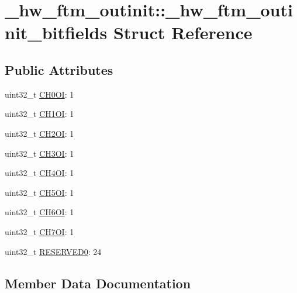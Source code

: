 \hypertarget{struct__hw__ftm__outinit_1_1__hw__ftm__outinit__bitfields}{}\section{\+\_\+hw\+\_\+ftm\+\_\+outinit\+:\+:\+\_\+hw\+\_\+ftm\+\_\+outinit\+\_\+bitfields Struct Reference}
\label{struct__hw__ftm__outinit_1_1__hw__ftm__outinit__bitfields}
\subsection*{Public Attributes}
\begin{DoxyCompactItemize}
\item 
uint32\+\_\+t \hyperlink{struct__hw__ftm__outinit_1_1__hw__ftm__outinit__bitfields_ac2361115514d6a903c91372a494c6cca}{C\+H0\+OI}\+: 1
\item 
uint32\+\_\+t \hyperlink{struct__hw__ftm__outinit_1_1__hw__ftm__outinit__bitfields_a6dea260517b53072ecbd94035b22b7a7}{C\+H1\+OI}\+: 1
\item 
uint32\+\_\+t \hyperlink{struct__hw__ftm__outinit_1_1__hw__ftm__outinit__bitfields_a97a917105c9550f2362c9abc636c1914}{C\+H2\+OI}\+: 1
\item 
uint32\+\_\+t \hyperlink{struct__hw__ftm__outinit_1_1__hw__ftm__outinit__bitfields_ae4ec76efe57617523ea011babdb64a11}{C\+H3\+OI}\+: 1
\item 
uint32\+\_\+t \hyperlink{struct__hw__ftm__outinit_1_1__hw__ftm__outinit__bitfields_ae56b6788ef384dc7fab75048b2a20025}{C\+H4\+OI}\+: 1
\item 
uint32\+\_\+t \hyperlink{struct__hw__ftm__outinit_1_1__hw__ftm__outinit__bitfields_a185a149ec76ca0d69ed4f07f28422646}{C\+H5\+OI}\+: 1
\item 
uint32\+\_\+t \hyperlink{struct__hw__ftm__outinit_1_1__hw__ftm__outinit__bitfields_ac4216440396b7e7aa7244153ee0cd647}{C\+H6\+OI}\+: 1
\item 
uint32\+\_\+t \hyperlink{struct__hw__ftm__outinit_1_1__hw__ftm__outinit__bitfields_a0ab691c18c3a3f99b196d73710a4e49d}{C\+H7\+OI}\+: 1
\item 
uint32\+\_\+t \hyperlink{struct__hw__ftm__outinit_1_1__hw__ftm__outinit__bitfields_acf5a18badec79bd54a0d88bed1b01620}{R\+E\+S\+E\+R\+V\+E\+D0}\+: 24
\end{DoxyCompactItemize}


\subsection{Member Data Documentation}
